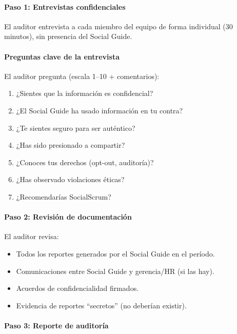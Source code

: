 \paragraph{Paso 1: Entrevistas confidenciales}

El auditor entrevista a cada miembro del equipo de forma individual (30 minutos), sin presencia del Social Guide.

\paragraph{Preguntas clave de la entrevista}

El auditor pregunta (escala 1--10 + comentarios):

\begin{enumerate}
    \item ¿Sientes que la información es confidencial?
    \item ¿El Social Guide ha usado información en tu contra?
    \item ¿Te sientes seguro para ser auténtico?
    \item ¿Has sido presionado a compartir?
    \item ¿Conoces tus derechos (opt-out, auditoría)?
    \item ¿Has observado violaciones éticas?
    \item ¿Recomendarías SocialScrum?
\end{enumerate}

\paragraph{Paso 2: Revisión de documentación}

El auditor revisa:
\begin{itemize}
    \item Todos los reportes generados por el Social Guide en el período.
    \item Comunicaciones entre Social Guide y gerencia/HR (si las hay).
    \item Acuerdos de confidencialidad firmados.
    \item Evidencia de reportes ``secretos'' (no deberían existir).
\end{itemize}

\paragraph{Paso 3: Reporte de auditoría}

